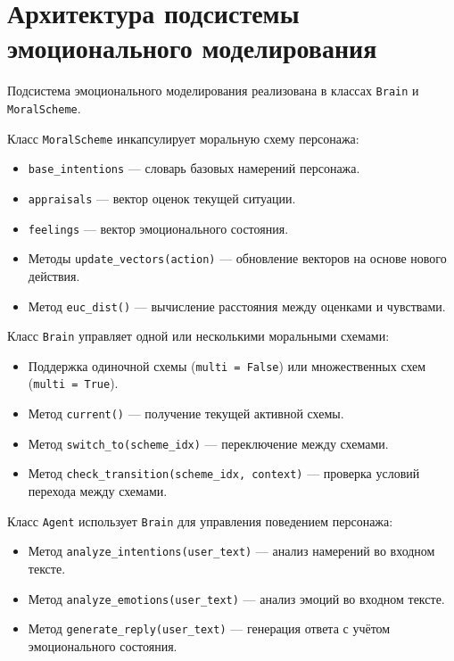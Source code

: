 \section{Архитектура подсистемы эмоционального моделирования}

Подсистема эмоционального моделирования реализована в классах \texttt{Brain} и \texttt{MoralScheme}.

Класс \texttt{MoralScheme} инкапсулирует моральную схему персонажа:
\begin{itemize}
	\item \texttt{base\_intentions} --- словарь базовых намерений персонажа.
	
	\item \texttt{appraisals} --- вектор оценок текущей ситуации.
	
	\item \texttt{feelings} --- вектор эмоционального состояния.
	
	\item Методы \texttt{update\_vectors(action)} --- обновление векторов на основе нового действия.
	
	\item Метод \texttt{euc\_dist()} --- вычисление расстояния между оценками и чувствами.
\end{itemize}

Класс \texttt{Brain} управляет одной или несколькими моральными схемами:
\begin{itemize}
	\item Поддержка одиночной схемы (\texttt{multi = False}) или множественных схем (\texttt{multi = True}).
	
	\item Метод \texttt{current()} --- получение текущей активной схемы.
	
	\item Метод \texttt{switch\_to(scheme\_idx)} --- переключение между схемами.
	
	\item Метод \texttt{check\_transition(scheme\_idx, context)} --- проверка условий перехода между схемами.
\end{itemize}

Класс \texttt{Agent} использует \texttt{Brain} для управления поведением персонажа:
\begin{itemize}
	\item Метод \texttt{analyze\_intentions(user\_text)} --- анализ намерений во входном тексте.
	
	\item Метод \texttt{analyze\_emotions(user\_text)} --- анализ эмоций во входном тексте.
	
	\item Метод \texttt{generate\_reply(user\_text)} --- генерация ответа с учётом эмоционального состояния.
\end{itemize}

